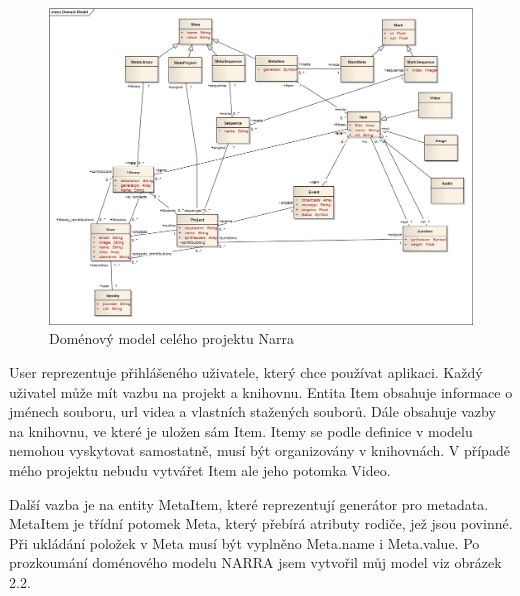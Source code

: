 \begin{figure}[H]
\includegraphics[width=1\textwidth]{./obrazova_priloha/domain_model.png}
\caption{Doménový model celého projektu Narra}
\end{figure}

\par User reprezentuje přihlášeného uživatele, který chce používat aplikaci. Každý uživatel může mít vazbu na projekt a knihovnu. Entita Item obsahuje informace o jménech souboru, url videa a vlastních stažených souborů. Dále obsahuje vazby na knihovnu, ve které je uložen sám Item. Itemy se podle definice v modelu nemohou vyskytovat samostatně, musí být organizovány v knihovnách. V případě mého projektu nebudu vytvářet Item ale jeho potomka Video. 
\par Další vazba je na entity MetaItem, které reprezentují generátor pro metadata. MetaItem je třídní potomek Meta, který přebírá atributy rodiče, jež jsou povinné. Při ukládání položek v Meta musí být vyplněno Meta.name i Meta.value. Po prozkoumání doménového modelu NARRA jsem vytvořil můj model viz obrázek 2.2.

